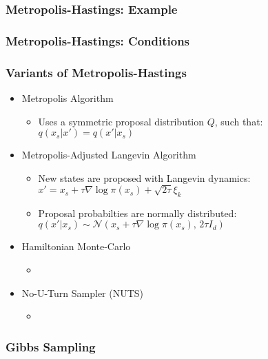 \documentclass{beamer}
\begin{document}
\begin{frame}
\frametitle{Metropolis-Hastings: Example}
\end{frame}


\begin{frame}
\frametitle{Metropolis-Hastings: Conditions}
\end{frame}




\begin{frame}
\frametitle{Variants of Metropolis-Hastings}
\begin{itemize}
  \item Metropolis Algorithm
  \begin{itemize}
    \item Uses a symmetric proposal distribution $Q$, such that: \\
     $q(x_s|x') = q(x'|x_s)$
  \end{itemize}
  \item Metropolis-Adjusted Langevin Algorithm
  \begin{itemize}
    \item New states are proposed with Langevin dynamics: \\
      $x' = x_s + \tau \nabla \log \pi(x_s) + \sqrt{2 \tau} \xi_k$
    \item Proposal probabilties are normally distributed: \\
      $q(x'| x_s) \sim \mathcal{N}(x_s + \tau \nabla \log \pi(x_s), \, 2 \tau  I_d)$
  \end{itemize}
  \item Hamiltonian Monte-Carlo
  \begin{itemize}
    \item
  \end{itemize}
  \item No-U-Turn Sampler (NUTS)
  \begin{itemize}
    \item
  \end{itemize}
\end{itemize}
\end{frame}




\begin{frame}
\frametitle{Gibbs Sampling}
\end{frame}


\end{document}
